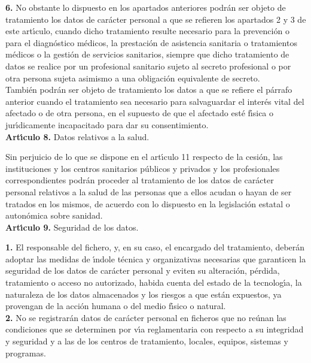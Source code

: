 {\bf 6.} No obstante lo dispuesto en los apartados anteriores podr\'an ser 
objeto de tratamiento los datos de car\'acter personal a que se refieren los 
apartados 2 y 3 de este art\'{\i}culo, cuando dicho tratamiento resulte 
necesario para la prevenci\'on o para el diagn\'ostico m\'edicos, la 
prestaci\'on de asistencia sanitaria o tratamientos m\'edicos o la gesti\'on de 
servicios sanitarios, siempre que dicho tratamiento de datos se realice por un 
profesional sanitario sujeto al secreto profesional o por otra persona sujeta 
asimismo a una obligaci\'on equivalente de secreto.\\
Tambi\'en podr\'an ser objeto de tratamiento los datos a que se refiere el 
p\'arrafo anterior cuando el tratamiento sea necesario para salvaguardar el 
inter\'es vital del afectado o de otra persona, en el supuesto de que el 
afectado est\'e f\'{\i}sica o jur\'{\i}dicamente incapacitado para dar su 
consentimiento.
\vspace{0.3cm}\\
{\large {\bf Art\'{\i}culo 8.} Datos relativos a la salud.}

Sin perjuicio de lo que se dispone en el art\'{\i}culo 11 respecto de la 
cesi\'on, las instituciones y los centros sanitarios p\'ublicos y privados y 
los profesionales correspondientes podr\'an proceder al tratamiento de los 
datos de car\'acter personal relativos a la salud de las personas que a ellos 
acudan o hayan de ser tratados en los mismos, de acuerdo con lo dispuesto en la 
legislaci\'on estatal o auton\'omica sobre sanidad.
\vspace{0.3cm}\\
{\large {\bf Art\'{\i}culo 9.} Seguridad de los datos.}

{\bf 1.} El responsable del fichero, y, en su caso, el encargado del 
tratamiento, deber\'an adoptar las medidas de \'{\i}ndole t\'ecnica y 
organizativas necesarias que garanticen la seguridad de los datos de car\'acter 
personal y eviten su alteraci\'on, p\'erdida, tratamiento o acceso no
autorizado, habida cuenta del estado de la tecnolog\'{\i}a, la naturaleza de 
los datos almacenados y los riesgos a que est\'an expuestos, ya provengan de la 
acci\'on humana o del medio f\'{\i}sico o natural.\\

{\bf 2.} No se registrar\'an datos de car\'acter personal en ficheros que no 
re\'unan las condiciones que se determinen por v\'{\i}a reglamentaria con 
respecto a su integridad y seguridad y a las de los centros de tratamiento,
locales, equipos, sistemas y programas.\\

